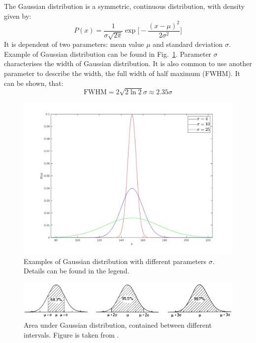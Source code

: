 \documentclass[12pt,a4paper]{report}
\begin{document}
The Gaussian distribution is a symmetric, continuous distribution, with density given by:
\begin{equation*}
P(x) = \frac{1}{\sigma \sqrt{2\pi}} \exp \Bigg[ - \frac{(x-\mu)^2}{2\sigma^2} \Bigg]
\end{equation*}
It is dependent of two parameters: mean value $\mu$ and standard deviation $\sigma$. Example of Gaussian distribution can be found in Fig.~\ref{fig:Gaussian}. Parameter $\sigma$ characterises the width of Gaussian distribution. It is also common to use another parameter to describe the width, the full width of half maximum (FWHM). It can be shown, that:
\begin{equation*}
\text{FWHM} = 2 \sqrt{2\ln 2}\sigma \approx 2.35 \sigma
\end{equation*}
\begin{figure}[!t]
\begin{center}
\includegraphics*[scale = 0.4]{Figures/Gauss}
\caption{\label{fig:Gaussian} Examples of Gaussian distribution with different parameters $\sigma$. Details can be found in the legend.}
\end{center}
\end{figure}
\begin{figure}[!t]
\begin{center}
\includegraphics*[scale = 0.3]{Figures/Gauss_intervals}
\caption{\label{fig:Gauss_intervals} Area under Gaussian distribution, contained between different intervals. Figure is taken from \cite{stat_2}.}
\end{center}
\end{figure}
\end{document}
